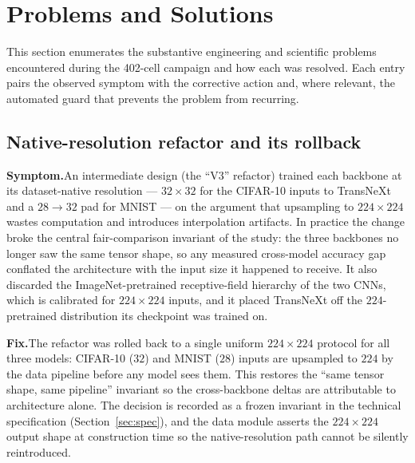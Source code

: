\section{Problems and Solutions}
\label{sec:problems}

This section enumerates the substantive engineering and scientific problems
encountered during the 402-cell campaign and how each was resolved. Each entry
pairs the observed symptom with the corrective action and, where relevant, the
automated guard that prevents the problem from recurring.

\subsection{Native-resolution refactor and its rollback}
\textbf{Symptom.}\quad An intermediate design (the ``V3'' refactor) trained each
backbone at its dataset-native resolution --- $32 \times 32$ for the CIFAR-10
inputs to TransNeXt and a $28 \rightarrow 32$ pad for MNIST --- on the argument
that upsampling to $224 \times 224$ wastes computation and introduces
interpolation artifacts. In practice the change broke the central
fair-comparison invariant of the study: the three backbones no longer saw the
same tensor shape, so any measured cross-model accuracy gap conflated the
architecture with the input size it happened to receive. It also discarded the
ImageNet-pretrained receptive-field hierarchy of the two CNNs, which is
calibrated for $224 \times 224$ inputs, and it placed TransNeXt off the
$224$-pretrained distribution its checkpoint was trained on.

\textbf{Fix.}\quad The refactor was rolled back to a single uniform
$224 \times 224$ protocol for all three models: CIFAR-10 ($32$) and MNIST
($28$) inputs are upsampled to $224$ by the data pipeline before any model
sees them. This restores the ``same tensor shape, same pipeline'' invariant so
the cross-backbone deltas are attributable to architecture alone. The decision
is recorded as a frozen invariant in the technical specification
(Section~\ref{sec:spec}), and the data module asserts the $224 \times 224$
output shape at construction time so the native-resolution path cannot be
silently reintroduced.

